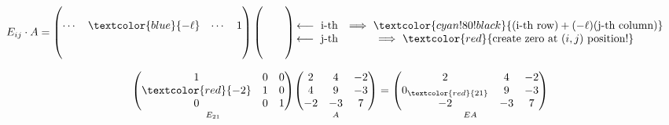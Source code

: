 \begin{definition*}[1B]
\begin{definition}
        \vspace{1em}

        \[
        E_{ij} \cdot A = \left(\begin{matrix}
         &  &  \\
        \cdots & \textcolor{blue}{-\ell} &  \cdots & 1 \\
        \\
         &  &  \\
        \end{matrix}\right)\left(\begin{matrix}
         &  &  \\
         &  &  \\
         &  &  \\
         &  &  
        \end{matrix}\right)\begin{matrix}
         &  &  \\
        \longleftarrow \ \text{i-th} & \Longrightarrow \ \textcolor{cyan!80!black}{(\text{i-th row}) + (-\ell)(\text{j-th column})}\\
        \longleftarrow \ \text{j-th} & \Longrightarrow \ \textcolor{red}{\text{create zero at } (i,j) \text{ position!}}\\
         &  &  
        \end{matrix}
        \]

    \end{definition}
\end{definition*}

\begin{eg}
    \[
        \underset{E_{21}}{\left(\begin{matrix}
        1 & 0 & 0 \\
        \textcolor{red}{-2} & 1 & 0 \\
        0 & 0 & 1 \\
        \end{matrix}\right)}\underset{A}{\left(\begin{matrix}
        2 & 4 & -2 \\
        4 & 9 & -3 \\
        -2 & -3 & 7 \\
        \end{matrix}\right)} = \underset{EA}{\left(\begin{matrix}
        2 & 4 & -2 \\
        0_{\textcolor{red}{21}} & 9 & -3 \\
        -2 & -3 & 7 \\
        \end{matrix}\right)}
        \]
\end{eg}

